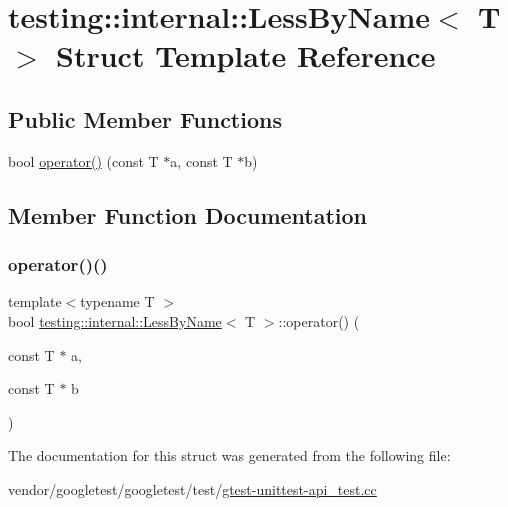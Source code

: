 \hypertarget{structtesting_1_1internal_1_1_less_by_name}{}\section{testing\+:\+:internal\+:\+:Less\+By\+Name$<$ T $>$ Struct Template Reference}
\label{structtesting_1_1internal_1_1_less_by_name}
\subsection*{Public Member Functions}
\begin{DoxyCompactItemize}
\item 
bool \hyperlink{structtesting_1_1internal_1_1_less_by_name_a62386ac7750bfc035536be55d90a52eb}{operator()} (const T $\ast$a, const T $\ast$b)
\end{DoxyCompactItemize}


\subsection{Member Function Documentation}
\mbox{\label{structtesting_1_1internal_1_1_less_by_name_a62386ac7750bfc035536be55d90a52eb}} 
\subsubsection{\texorpdfstring{operator()()}{operator()()}}
{\footnotesize\ttfamily template$<$typename T $>$ \\
bool \hyperlink{structtesting_1_1internal_1_1_less_by_name}{testing\+::internal\+::\+Less\+By\+Name}$<$ T $>$\+::operator() (\begin{DoxyParamCaption}\item[{const T $\ast$}]{a,  }\item[{const T $\ast$}]{b }\end{DoxyParamCaption})\hspace{0.3cm}{\ttfamily [inline]}}



The documentation for this struct was generated from the following file\+:\begin{DoxyCompactItemize}
\item 
vendor/googletest/googletest/test/\hyperlink{gtest-unittest-api__test_8cc}{gtest-\/unittest-\/api\+\_\+test.\+cc}\end{DoxyCompactItemize}
